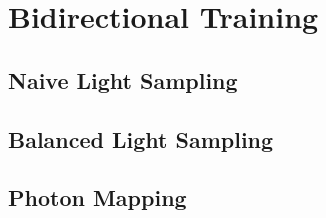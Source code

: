 
\chapter{Bidirectional Training}
\label{chap:bidirectional_training}

\section{Naive Light Sampling}

\section{Balanced Light Sampling}

\section{Photon Mapping}